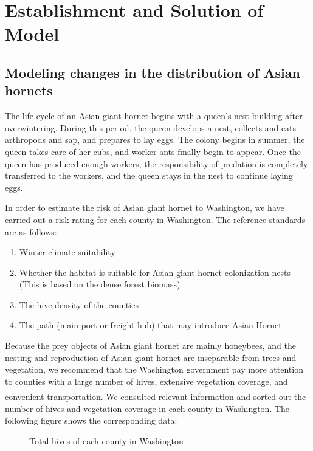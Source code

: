 \documentclass{mcmthesis}
\numberwithin{figure}{section}
\numberwithin{table}{section}
\newcommand{\upcite}[1]{\textsuperscript{\textsuperscript{\cite{#1}}}}
\begin{document}
\section{Establishment and Solution of Model}
\subsection{Modeling changes in the distribution of Asian hornets}

The life cycle of an Asian giant hornet begins with a queen’s nest building after overwintering. During this period, the queen develops a nest, collects and eats arthropods and sap, and prepares to lay eggs. The colony begins in summer, the queen takes care of her cubs, and worker ants finally begin to appear. Once the queen has produced enough workers, the responsibility of predation is completely transferred to the workers, and the queen stays in the nest to continue laying eggs.


In order to estimate the risk of Asian giant hornet to Washington, we have carried out a risk rating for each county in Washington. The reference standards are as follows: 
\begin{enumerate}
  \item Winter climate suitability
  \item Whether the habitat is suitable for Asian giant hornet colonization nests (This is based on the dense forest biomass)
  \item The hive density of the counties
  \item The path (main port or freight hub) that may introduce Asian Hornet
\end{enumerate}

Because the prey objects of Asian giant hornet are mainly honeybees, and the nesting and reproduction of Asian giant hornet are inseparable from trees and vegetation, we recommend that the Washington government pay more attention to counties with a large number of hives, extensive vegetation coverage, and convenient transportation. We consulted relevant information \upcite{REF1} and sorted out the number of hives and vegetation coverage in each county in Washington. The following figure shows the corresponding data:



\begin{figure}[H]
  \caption{Total hives of each county in Washington}\label{1_1}
\end{figure}
\end{document}
